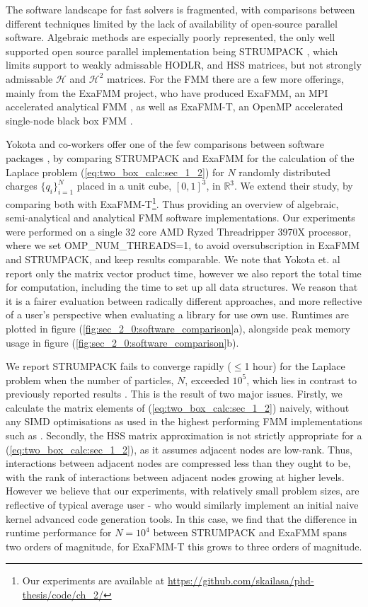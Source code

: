 The software landscape for fast solvers is fragmented, with comparisons between different techniques limited by the lack of availability of open-source parallel software. Algebraic methods are especially poorly represented, the only well supported open source parallel implementation being STRUMPACK \cite{ghyselsstrumpack}, which limits support to weakly admissable HODLR, and HSS matrices, but not strongly admissable $\mathcal{H}$ and $\mathcal{H}^2$ matrices. For the FMM there are a few more offerings, mainly from the ExaFMM project, who have produced ExaFMM, an MPI accelerated analytical FMM \cite{exafmm}, as well as ExaFMM-T, an OpenMP accelerated single-node black box FMM \cite{wang2021exafmm}.

Yokota and co-workers offer one of the few comparisons between software packages \cite{yokota2015fast}, by comparing STRUMPACK and ExaFMM for the calculation of the Laplace problem (\ref{eq:two_box_calc:sec_1_2}) for $N$ randomly distributed charges $\{ q_i\}_{i=1}^N$ placed in a unit cube, $[0, 1]^3$, in $\mathbb{R}^3$. We extend their study, by comparing both with ExaFMM-T\footnote{Our experiments are available at \url{https://github.com/skailasa/phd-thesis/code/ch_2/}}. Thus providing an overview of algebraic, semi-analytical and analytical FMM software implementations. Our experiments were performed on a single 32 core AMD Ryzed Threadripper 3970X processor, where we set OMP\_NUM\_THREADS=1, to avoid oversubscription in ExaFMM and STRUMPACK, and keep results comparable. We note that Yokota et. al report only the matrix vector product time, however we also report the total time for computation, including the time to set up all data structures. We reason that it is a fairer evaluation between radically different approaches, and more reflective of a user's perspective when evaluating a library for use own use. Runtimes are plotted in figure (\ref{fig:sec_2_0:software_comparison}a), alongside peak memory usage in figure (\ref{fig:sec_2_0:software_comparison}b). 

We report STRUMPACK fails to converge rapidly ($\leq$1 hour) for the Laplace problem when the number of particles, $N$, exceeded $10^5$, which lies in contrast to previously reported results \cite{yokota2015fast}. This is the result of two major issues. Firstly, we calculate the matrix elements of (\ref{eq:two_box_calc:sec_1_2}) naively, without any SIMD optimisations as used in the highest performing FMM implementations such as \cite{wang2021exafmm}. Secondly, the HSS matrix approximation is not strictly appropriate for a (\ref{eq:two_box_calc:sec_1_2}), as it assumes adjacent nodes are low-rank. Thus, interactions between adjacent nodes are compressed less than they ought to be, with the rank of interactions between adjacent nodes growing at higher levels. However we believe that our experiments, with relatively small problem sizes, are reflective of typical average user - who would similarly implement an initial naive kernel advanced code generation tools. In this case, we find that the difference in runtime performance for $N=10^4$ between STRUMPACK and ExaFMM spans two orders of magnitude, for ExaFMM-T this grows to three orders of magnitude. 

